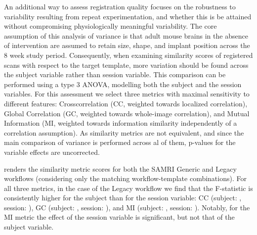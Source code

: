 An additional way to assess registration quality focuses on the robustness to variability resulting from repeat experimentation, and whether this is be attained without compromising physiologically meaningful variability.
The core assumption of this analysis of variance is that adult mouse brains in the absence of intervention are assumed to retain size, shape, and implant position across the 8 week study period.
Consequently, when examining similarity scores of registered scans with respect to the target template, more variation should be found across the subject variable rather than session variable.
This comparison can be performed using a type 3 ANOVA, modelling both the subject and the session variables.
For this assessment we select three metrics with maximal sensitivity to different features:
Crosscorrelation (CC, weighted towards localized correlation),
Global Correlation (GC, weighted towards whole-image correlation),
and Mutual Information (MI, weighted towards information similarity independently of a correlation assumption).
As similarity metrics are not equivalent, and since the main comparison of variance is performed across al of them, p-values for the variable effects are uncorrected.

 renders the similarity metric scores for both the SAMRI Generic and Legacy workflows (considering only the matching workflow-template combinations).
For all three metrics, in the case of the Legacy workflow we find that the F-statistic is consistently higher for the subject than for the session variable:
CC (subject: , session: ),
GC (subject: , session: ),
and MI (subject: , session: ).
Notably, for the MI metric the effect of the session variable is significant, but not that of the subject variable. 


